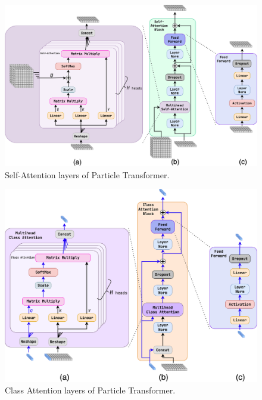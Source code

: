 \begin{figure}[htb]
    \centering
    \includegraphics[width=1\linewidth]{src/diagrams/part_layers_1.png}
    \caption{Self-Attention layers of Particle Transformer.}
    \label{fig:part_SA}
\end{figure}

\begin{figure}[htb]
    \centering
    \includegraphics[width=1\linewidth]{src/diagrams/part_layers_2.png}
    \caption{Class Attention layers of Particle Transformer.}
    \label{fig:part_CA}
\end{figure}

